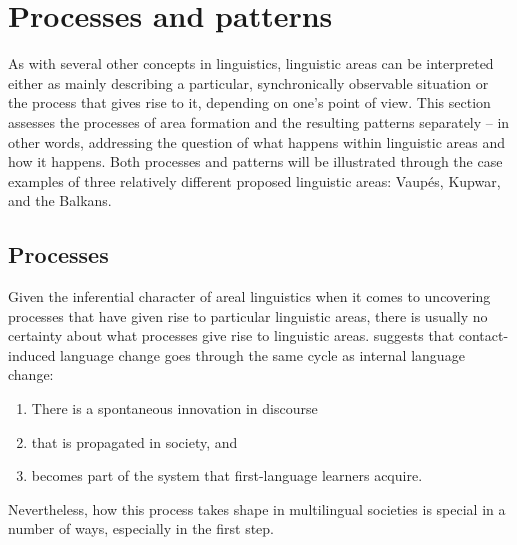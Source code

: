 \documentclass[output=paper,
modfonts
]{langscibook}
\begin{document}
\section{Processes and patterns} \label{sec-patterns-processes}

As with several other concepts in linguistics, linguistic areas can be interpreted either as mainly describing a particular, synchronically observable situation or the process that gives rise to it, depending on one's point of view. This section assesses the processes of area formation and the resulting patterns separately -- in other words, addressing the question of what happens within linguistic areas and how it happens. Both processes and patterns will be illustrated through the case examples of three relatively different proposed linguistic areas: Vaupés, Kupwar, and the Balkans.

\subsection{Processes} \label{sec:processes}

Given the inferential character of areal linguistics when it comes to uncovering processes that have given rise to particular linguistic areas, there is usually no certainty about what processes give rise to linguistic areas. \cite{Matras2011Explaining} suggests that contact-induced language change goes through the same cycle as internal language change:

\begin{enumerate}
\setlength{\itemsep}{0.0\baselineskip}
\item There is a spontaneous innovation in discourse
\item that is propagated in society, and
\item becomes part of the system that first-language learners acquire.

\end{enumerate}
Nevertheless, how this process takes shape in multilingual societies is special in a number of ways, especially in the first step.
\end{document}
